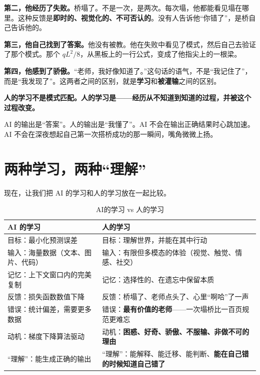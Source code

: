 \textbf{第二，他经历了失败。}桥塌了。不是一次，是两次。每次塌，他都能看见塌在哪里。这种反馈是\textbf{即时的、视觉化的、不可否认的}。没有人告诉他“你错了”，是桥自己告诉他的。

\textbf{第三，他自己找到了答案。}他没有被教。他在失败中看见了模式，然后自己去验证了那个模式。那个 $qL^2/8$，从黑板上的一行公式，变成了他指尖上的一根梁。

\textbf{第四，他感到了骄傲。}“老师，我好像知道了。”这句话的语气，不是“我记住了”，而是“我发现了”。这两者之间的区别，就是\textbf{学习}和\textbf{被灌输}之间的区别。

\begin{insight}
\label{insight:chap1-3}

\textbf{人的学习不是模式匹配。人的学习是——经历从不知道到知道的过程，并被这个过程改变。}

AI 的输出是“答案”。人的输出是“我懂了”。AI 不会在输出正确结果时心跳加速。AI 不会在深夜想起自己第一次搭桥成功的那一瞬间，嘴角微微上扬。
\end{insight}

\section{两种学习，两种“理解”}

现在，让我们把 AI 的学习和人的学习放在一起比较。

\begin{table}[H]
\centering
\begin{tabular}{p{} p{}}
\toprule
\textbf{AI 的学习} & \textbf{人的学习} \\
\midrule
目标：最小化预测误差 & 目标：理解世界，并能在其中行动 \\
\addlinespace
输入：海量数据（文本、图片、代码） & 输入：有限但多模态的体验（视觉、触觉、情感、社交） \\
\addlinespace
记忆：上下文窗口内的完美复制 & 记忆：选择性的、在遗忘中保留本质 \\
\addlinespace
反馈：损失函数数值下降 & 反馈：桥塌了、老师点头了、心里“啊哈”了一声 \\
\addlinespace
错误：统计偏差，需要更多数据 & 错误：\textbf{最有价值的老师}——一次塌桥比一百页规范更难忘 \\
\addlinespace
动机：梯度下降算法驱动 & 动机：\textbf{困惑、好奇、骄傲、不服输、非做不可的理由} \\
\addlinespace
“理解”：能生成正确的输出 & “理解”：能解释、能迁移、能判断、\textbf{能在自己错的时候知道自己错了} \\
\bottomrule
\end{tabular}
\caption{AI的学习 vs 人的学习}
\label{tab:ai-vs-human}
\end{table}

